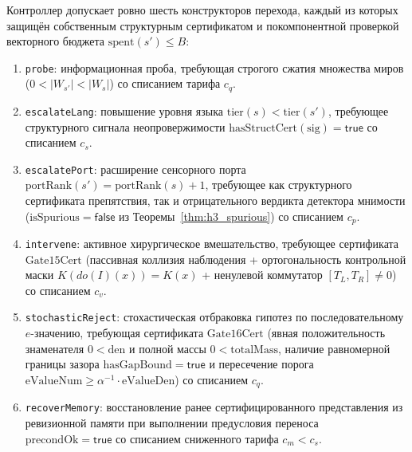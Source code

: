 \documentclass[11pt,a4paper]{article}
\theoremstyle{cleanthm}
\theoremstyle{cleandef}
\begin{document}
Контроллер допускает ровно шесть конструкторов перехода, каждый из которых защищён собственным структурным сертификатом и покомпонентной проверкой векторного бюджета $\mathrm{spent}(s') \le B$:
\begin{enumerate}
  \item \texttt{probe}: информационная проба, требующая строгого сжатия множества миров ($0 < |W_{s'}| < |W_s|$) со списанием тарифа $c_q$.
  \item \texttt{escalateLang}: повышение уровня языка $\mathrm{tier}(s) < \mathrm{tier}(s')$, требующее структурного сигнала неопровержимости $\mathrm{hasStructCert}(\mathrm{sig})=\mathsf{true}$ со списанием $c_s$.
  \item \texttt{escalatePort}: расширение сенсорного порта $\mathrm{portRank}(s')=\mathrm{portRank}(s)+1$, требующее как структурного сертификата препятствия, так и отрицательного вердикта детектора мнимости ($\mathrm{isSpurious}=\mathsf{false}$ из Теоремы~\ref{thm:h3_spurious}) со списанием $c_p$.
  \item \texttt{intervene}: активное хирургическое вмешательство, требующее сертификата $\mathrm{Gate15Cert}$ (пассивная коллизия наблюдения + ортогональность контрольной маски $K(do(I)(x))=K(x)$ + ненулевой коммутатор $[T_L,T_R]\ne 0$) со списанием $c_v$.
  \item \texttt{stochasticReject}: стохастическая отбраковка гипотез по последовательному $e$-значению, требующая сертификата $\mathrm{Gate16Cert}$ (явная положительность знаменателя $0<\mathrm{den}$ и полной массы $0<\mathrm{totalMass}$, наличие равномерной границы зазора $\mathrm{hasGapBound}=\mathsf{true}$ и пересечение порога $\mathrm{eValueNum}\ge \alpha^{-1}\cdot\mathrm{eValueDen}$) со списанием $c_q$.
  \item \texttt{recoverMemory}: восстановление ранее сертифицированного представления из ревизионной памяти при выполнении предусловия переноса $\mathrm{precondOk}=\mathsf{true}$ со списанием сниженного тарифа $c_m < c_s$.
\end{enumerate}
\end{document}
